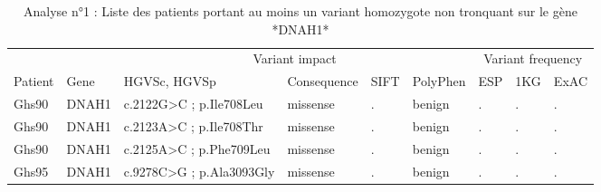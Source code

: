\documentclass[12pt,twoside]{reedthesis}
\theoremstyle{definition}
\theoremstyle{definition}
\theoremstyle{remark}
\begin{document}
  \begin{landscape}
  \begin{longtable}[t]{lllllllll}
  \caption{\label{tab:tabdnah1moderate}Analyse n°1 : Liste des patients portant au moins un variant homozygote non tronquant sur le gène *DNAH1*}\\
  \toprule
  \multicolumn{1}{c}{ } & \multicolumn{1}{c}{ } & \multicolumn{4}{c}{Variant impact} & \multicolumn{3}{c}{Variant frequency} \\
  \cmidrule(l{2pt}r{2pt}){3-6} \cmidrule(l{2pt}r{2pt}){7-9}
  Patient & Gene & HGVSc, HGVSp & Consequence & SIFT & PolyPhen & ESP & 1KG & ExAC\\
  \midrule
  Ghs90 & DNAH1 & c.2122G>C ; p.Ile708Leu & missense & . & benign & . & . & .\\
  Ghs90 & DNAH1 & c.2123A>C ; p.Ile708Thr & missense & . & benign & . & . & .\\
  Ghs90 & DNAH1 & c.2125A>C ; p.Phe709Leu & missense & . & benign & . & . & .\\
  Ghs95 & DNAH1 & c.9278C>G ; p.Ala3093Gly & missense & . & benign & . & . & .\\
  \bottomrule
  \end{longtable}
  \end{landscape}
  
  \newpage
  
\end{document}
